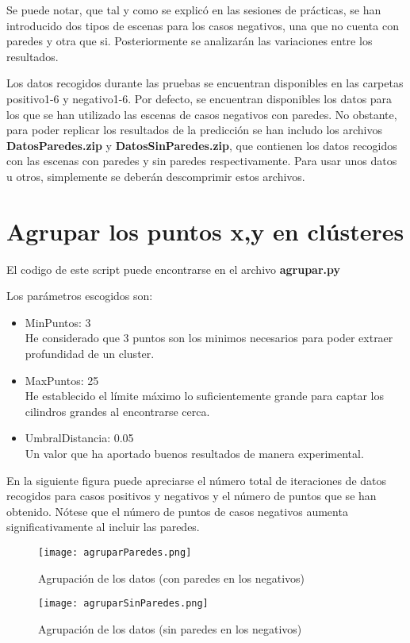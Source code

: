 Se puede notar, que tal y como se explicó en las sesiones de prácticas, se han introducido dos tipos de escenas para los casos negativos, una que no cuenta con paredes y otra que si. Posteriormente se analizarán las variaciones entre los resultados.

Los datos recogidos durante las pruebas se encuentran disponibles en las carpetas positivo1-6 y negativo1-6. Por defecto, se encuentran disponibles los datos para los que se han utilizado las escenas de casos negativos con paredes.
No obstante, para poder replicar los resultados de la predicción se han includo los archivos \textbf{DatosParedes.zip} y \textbf{DatosSinParedes.zip}, que contienen los datos recogidos con las escenas con paredes y sin paredes respectivamente. Para usar unos datos u otros, simplemente se deberán descomprimir estos archivos.

\newpage

\section{Agrupar los puntos x,y en clústeres}

El codigo de este script puede encontrarse en el archivo \textbf{agrupar.py}

Los parámetros escogidos son:
\begin{itemize}
	\item MinPuntos: 3 \\ He considerado que 3 puntos son los minimos necesarios para poder extraer profundidad de un cluster.
	\item MaxPuntos: 25 \\ He establecido el límite máximo lo suficientemente grande para captar los cilindros grandes al encontrarse cerca.
	\item UmbralDistancia: 0.05 \\ Un valor que ha aportado buenos resultados de manera experimental.
\end{itemize}

En la siguiente figura puede apreciarse el número total de iteraciones de datos recogidos para casos positivos y negativos y el número de puntos que se han obtenido. Nótese que el número de puntos de casos negativos aumenta significativamente al incluir las paredes.

\begin{figure}[H]
	\centering
	\texttt{[image: agruparParedes.png]}
	\caption{Agrupación de los datos (con paredes en los negativos)}
\end{figure}
\begin{figure}[H]
	\centering
	\texttt{[image: agruparSinParedes.png]}
	\caption{Agrupación de los datos (sin paredes en los negativos)}
\end{figure}

